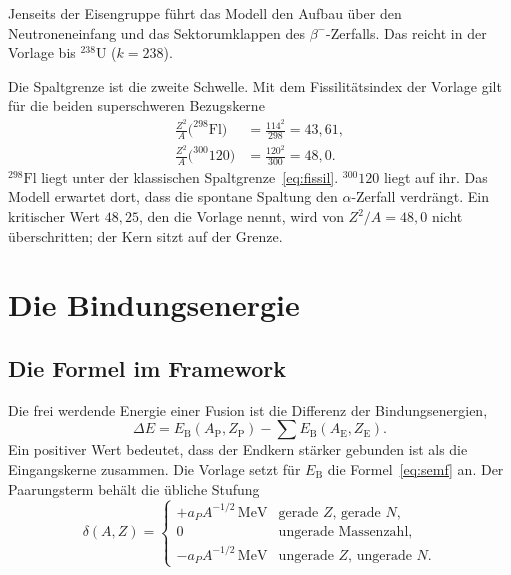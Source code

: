 \documentclass[11pt,a4paper]{article}
\theoremstyle{definition}
\theoremstyle{remark}
\newcommand{\EB}{E_{\mathrm{B}}}
\begin{document}
Jenseits der Eisengruppe führt das Modell den Aufbau über den Neutroneneinfang und das Sektorumklappen des \(\beta^-\)-Zerfalls. Das reicht in der Vorlage bis \(^{238}\mathrm{U}\) (\(k=238\)).

Die Spaltgrenze ist die zweite Schwelle. Mit dem Fissilitätsindex der Vorlage gilt für die beiden superschweren Bezugskerne
\begin{align}
\frac{Z^2}{A}\bigl(^{298}\mathrm{Fl}\bigr)&=\frac{114^2}{298}=43{,}61,\\
\frac{Z^2}{A}\bigl(^{300}120\bigr)&=\frac{120^2}{300}=48{,}0.
\end{align}
\(^{298}\mathrm{Fl}\) liegt unter der klassischen Spaltgrenze~\eqref{eq:fissil}. \(^{300}120\) liegt auf ihr. Das Modell erwartet dort, dass die spontane Spaltung den \(\alpha\)-Zerfall verdrängt. Ein kritischer Wert \(48{,}25\), den die Vorlage nennt, wird von \(Z^2/A=48{,}0\) nicht überschritten; der Kern sitzt auf der Grenze.

\section{Die Bindungsenergie}
\label{sec:energie}

\subsection{Die Formel im Framework}

Die frei werdende Energie einer Fusion ist die Differenz der Bindungsenergien,
\begin{equation}
\label{eq:deltaE}
\Delta E
= \EB(A_{\mathrm{P}},Z_{\mathrm{P}})
- \sum \EB(A_{\mathrm{E}},Z_{\mathrm{E}}).
\end{equation}
Ein positiver Wert bedeutet, dass der Endkern stärker gebunden ist als die Eingangskerne zusammen. Die Vorlage setzt für \(\EB\) die Formel~\eqref{eq:semf} an. Der Paarungsterm behält die übliche Stufung
\begin{equation}
\label{eq:delta}
\delta(A,Z)=
\begin{cases}
+a_P A^{-1/2}\,\mathrm{MeV} & \text{gerade \(Z\), gerade \(N\)},\\
0 & \text{ungerade Massenzahl},\\
-a_P A^{-1/2}\,\mathrm{MeV} & \text{ungerade \(Z\), ungerade \(N\)}.
\end{cases}
\end{equation}
\end{document}
